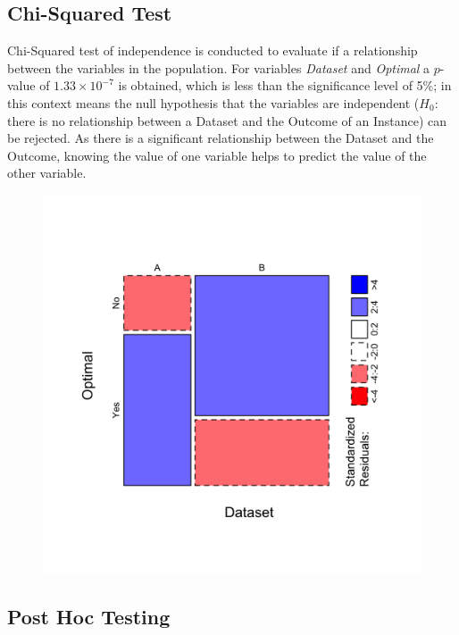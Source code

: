\documentclass[5p,times]{elsarticle}
\begin{document}
	\subsection{Chi-Squared Test}
	
		Chi-Squared test of independence is conducted to evaluate if a relationship between the variables in the population. For variables \textit{Dataset} and \textit{Optimal} a $p$-value of $1.33 \times 10^{-7}$ is obtained, which is less than the significance level of 5\%; in this context means the null hypothesis that the variables are independent ($H_{0}$: there is no relationship between a Dataset and the Outcome of an Instance) can be rejected. As there is a significant relationship between the Dataset and the Outcome, knowing the value of one variable helps to predict the value of the other variable.
		
			\begin{figure}
				\begin{center}
					\includegraphics[scale=0.09]{fig/mosaicplot}
					\label{fig:mosaicplot}
				\end{center}
			\end{figure}
	
	\subsection{Post Hoc Testing}
	
\end{document}

